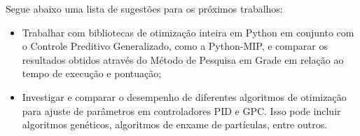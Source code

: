 \documentclass[12pt,           %
a4paper,                       %
openany,                       %
oneside,                       %
chapter=TITLE,                 %
english,                       %
spanish,                       %
brazil,                        %
sumario=tradicional]{abntex2}  %
\begin{document}
\begin{OnehalfSpace}
Segue abaixo uma lista de sugestões para os próximos trabalhos:

\begin{itemize}
\item Trabalhar com bibliotecas de otimização inteira em Python em conjunto com o Controle Preditivo Generalizado, como a Python-MIP, e comparar os resultados obtidos através do Método de Pesquisa em Grade em relação ao tempo de execução e pontuação;
\item Investigar e comparar o desempenho de diferentes algoritmos de otimização para ajuste de parâmetros em controladores PID e GPC. Isso pode incluir algoritmos genéticos, algoritmos de enxame de partículas, entre outros.
\end{itemize}


			
		
\end{OnehalfSpace}                          %
\label{lastpage}
\end{document}
